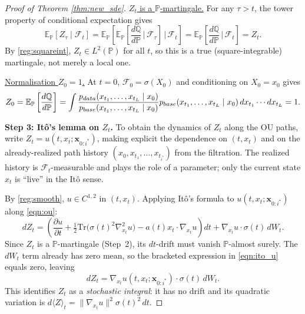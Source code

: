 \documentclass{article}
\newcommand{\pdata}{p_{\normalfont{data}}}
\newcommand{\pbase}{p_{\normalfont{base}}}
\newcommand{\PP}{\mathbb{P}}
\newcommand{\QQ}{\mathbb{Q}}
\newcommand{\EE}{\mathbb{E}}
\newcommand{\FF}{\mathcal{F}}
\begin{document}
\begin{proof}[Proof of Theorem \ref{thm:new_sde}]
\medskip\noindent\underline{$Z_t$ is a $\PP$-martingale.}
For any $\tau>t$, the tower property of conditional expectation gives
\[
  \EE_\PP[Z_\tau\mid\FF_t]
  = \EE_\PP\left[\EE_\PP\left[\frac{d\QQ}{d\PP}\,\bigg|\,\FF_\tau\right]\,\bigg|\,\FF_t\right]
  = \EE_\PP\left[\frac{d\QQ}{d\PP}\,\bigg|\,\FF_t\right]
  = Z_t.
\]
By \ref{reg:squareint}, $Z_t\in L^2(\PP)$ for all $t$, so this is a true (square-integrable)
martingale, not merely a local one.

\medskip\noindent\underline{Normalisation $Z_0=1$.}
At $t=0$, $\FF_0=\sigma(X_0)$ and conditioning on $X_0=x_0$ gives
\[
  Z_0
  = \EE_\PP\left[\frac{d\QQ}{d\PP}\right]
  = \int \frac{\pdata(x_{t_1},\ldots,x_{t_L}\mid x_0)}
              {\pbase(x_{t_1},\ldots,x_{t_L}\mid x_0)}
    \pbase(x_{t_1},\ldots,x_{t_L}\mid x_0)\,dx_{t_1}\cdots dx_{t_L}
  = 1.
\]

\noindent\textbf{Step 3: It\^o's lemma on $Z_t$.}
To obtain the dynamics of $Z_t$ along the OU paths, write $Z_t=u(t,x_t;\mathbf{x}_{0:i^*})$,
making explicit the dependence on $(t,x_t)$ and on the already-realized path
history $(x_0,x_{t_1},\ldots,x_{t_{i^*}})$ from the filtration.  The realized history
is $\FF_t$-measurable and plays the role of a parameter;
only the current state $x_t$ is ``live'' in the It\^o sense.

By \ref{reg:smooth}, $u\in C^{1,2}$ in $(t,x_t)$.
Applying It\^o's formula \cite{ito1944109, ito1951stochastic} to $u(t,x_t;\mathbf{x}_{0:i^*})$ along \eqref{eqn:ou}:
\begin{equation}\label{eqn:ito_u}
  dZ_t
  = \left(\frac{\partial u}{\partial t}
    + \tfrac{1}{2}\mathrm{Tr}\bigl(\sigma(t)^2\nabla_{x_t}^2 u\bigr)
    - a(t)x_t\cdot\nabla_{x_t}u\right)dt
  + \nabla_{x_t}u\cdot\sigma(t)\,dW_t.
\end{equation}
Since $Z_t$ is a $\PP$-martingale (Step~2), its $dt$-drift must vanish
$\PP$-almost surely.  The $dW_t$ term already has zero mean, so the bracketed
expression in \eqref{eqn:ito_u} equals zero, leaving
\begin{equation}\label{eqn:dZt}
  dZ_t = \nabla_{x_t}u(t,x_t;\mathbf{x}_{0:i^*})\cdot\sigma(t)\,dW_t.
\end{equation}
This identifies $Z_t$ as a \emph{stochastic integral}: it has no drift and
its quadratic variation is $d\langle Z\rangle_t = \|\nabla_{x_t}u\|^2\sigma(t)^2\,dt$.


\end{proof}
\end{document}
